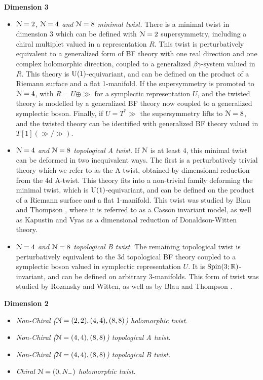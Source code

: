 \documentclass[10pt, oneside]{article}
\begin{document}
\textbf{Dimension 3}
\begin{itemize}
 \item \emph{$\mathcal{N}=2$, $\mathcal{N}=4$ and $\mathcal{N}=8$ minimal twist.} There is a minimal twist in dimension 3 which can be defined with $\mathcal{N}=2$ supersymmetry, including a chiral multiplet valued in a representation $R$.  This twist is perturbatively equivalent to a generalized form of BF theory with one real direction and one complex holomorphic direction, coupled to a generalized $\beta \gamma$-system valued in $R$.  This theory is $\mathrm{U}(1)$-equivariant, and can be defined on the product of a Riemann surface and a flat 1-manifold.  If the supersymmetry is promoted to $\mathcal{N}=4$, with $R = U \oplus \gg$ for a symplectic representation $U$, and the twisted theory is modelled by a generalized BF theory now coupled to a generalized symplectic boson.  Finally, if $U = T^*\gg$ the supersymmetry lifts to $\mathcal{N}=8$, and the twisted theory can be identified with generalized BF theory valued in $T[1](\gg/\gg)$.
 \item \emph{$\mathcal{N}=4$ and $\mathcal{N}=8$ topological A twist.} If $\mathcal{N}$ is at least 4, this minimal twist can be deformed in two inequivalent ways.  The first is a perturbatively trivial theory which we refer to as the A-twist, obtained by dimensional reduction from the 4d A-twist.  This theory fits into a non-trivial family deforming the minimal twist, which is $\mathrm{U}(1)$-equivariant, and can be defined on the product of a Riemann surface and a flat 1-manifold.  This twist was studied by Blau and Thompson \cite{BlauThompson1}, where it is referred to as a Casson invariant model, as well as Kapustin and Vyas \cite{KapustinVyas} as a dimensional reduction of Donaldson-Witten theory.
 \item \emph{$\mathcal{N}=4$ and $\mathcal{N}=8$ topological B twist.} The remaining topological twist is perturbatively equivalent to the 3d topological BF theory coupled to a symplectic boson valued in symplectic representation $U$.  It is $\mathrm{Spin}(3;\mathbb R)$-invariant, and can be defined on arbitrary 3-manifolds. This form of twist was studied by Rozansky and Witten, \cite{RozanskyWitten} as well as by Blau and Thompson \cite{BlauThompson2}.
\end{itemize}

\textbf{Dimension 2}
\begin{itemize}
 \item \emph{Non-Chiral ($\mathcal{N}=(2,2), (4,4), (8,8)$) holomorphic twist.}
 \item \emph{Non-Chiral ($\mathcal{N}=(4,4), (8,8)$) topological A twist.}
 \item \emph{Non-Chiral ($\mathcal{N}=(4,4), (8,8)$) topological B twist.}
 \item \emph{Chiral $\mathcal{N}=(0,N_-)$ holomorphic twist.}
\end{itemize}
\end{document}
